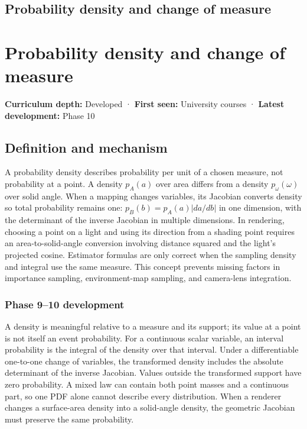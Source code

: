 \hypertarget{appendix-4815cd87ab8b}{}
\section*{Probability density and change of measure}
\chapter{Probability density and change of measure}\label{appendix-4815cd87ab8b-probability-density-and-change-of-measure}

\textbf{Curriculum depth:} Developed · \textbf{First seen:} University courses · \textbf{Latest development:} Phase 10

\section{Definition and mechanism}\label{appendix-4815cd87ab8b-definition-and-mechanism}

A probability density describes probability per unit of a chosen measure, not probability at a point. A density \(p_A(a)\) over area differs from a density \(p_\omega(\omega)\) over solid angle. When a mapping changes variables, its Jacobian converts density so total probability remains one: \(p_B(b)=p_A(a)|da/db|\) in one dimension, with the determinant of the inverse Jacobian in multiple dimensions. In rendering, choosing a point on a light and using its direction from a shading point requires an area-to-solid-angle conversion involving distance squared and the light's projected cosine. Estimator formulas are only correct when the sampling density and integral use the same measure. This concept prevents missing factors in importance sampling, environment-map sampling, and camera-lens integration.

\subsection{Phase 9--10 development}\label{appendix-4815cd87ab8b-phase-910-development}

A density is meaningful relative to a measure and its support; its value at a point is not itself an event probability. For a continuous scalar variable, an interval probability is the integral of the density over that interval. Under a differentiable one-to-one change of variables, the transformed density includes the absolute determinant of the inverse Jacobian. Values outside the transformed support have zero probability. A mixed law can contain both point masses and a continuous part, so one PDF alone cannot describe every distribution. When a renderer changes a surface-area density into a solid-angle density, the geometric Jacobian must preserve the same probability.

